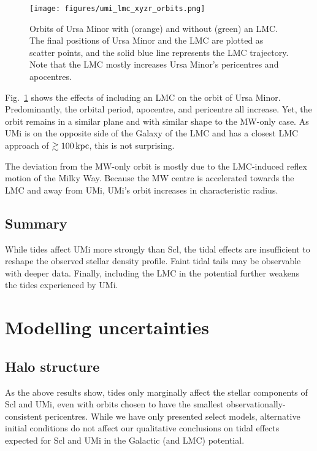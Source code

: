 \begin{figure}
\centering
\texttt{[image: figures/umi\_lmc\_xyzr\_orbits.png]}
\caption[Ursa Minor orbits with LMC]{Orbits of Ursa Minor with (orange)
and without (green) an LMC. The final positions of Ursa Minor and the
LMC are plotted as scatter points, and the solid blue line represents
the LMC trajectory. Note that the LMC mostly increases Ursa Minor's
pericentres and apocentres.}\label{fig:umi_orbits_lmc}
\end{figure}

Fig.~\ref{fig:umi_orbits_lmc} shows the effects of including an LMC on
the orbit of Ursa Minor. Predominantly, the orbital period, apocentre,
and pericentre all increase. Yet, the orbit remains in a similar plane
and with similar shape to the MW-only case. As UMi is on the opposite
side of the Galaxy of the LMC and has a closest LMC approach of
\(\gtrsim 100\,{\rm kpc}\), this is not surprising.

The deviation from the MW-only orbit is mostly due to the LMC-induced
reflex motion of the Milky Way. Because the MW centre is accelerated
towards the LMC and away from UMi, UMi's orbit increases in
characteristic radius.

\subsection{Summary}\label{summary-1}

While tides affect UMi more strongly than Scl, the tidal effects are
insufficient to reshape the observed stellar density profile. Faint
tidal tails may be observable with deeper data. Finally, including the
LMC in the potential further weakens the tides experienced by UMi.

\section{Modelling uncertainties}\label{modelling-uncertainties}

\subsection{Halo structure}\label{halo-structure}

As the above results show, tides only marginally affect the stellar
components of Scl and UMi, even with orbits chosen to have the smallest
observationally-consistent pericentres. While we have only presented
select models, alternative initial conditions do not affect our
qualitative conclusions on tidal effects expected for Scl and UMi in the
Galactic (and LMC) potential.


